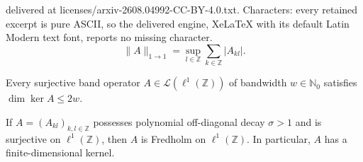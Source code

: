 \documentclass[10pt,a4paper]{amsart}
\def\Z{{\mathbb Z}}
\begin{document}
delivered at licenses/arxiv-2608.04992-CC-BY-4.0.txt. Characters: every retained excerpt is pure ASCII, so the delivered engine, XeLaTeX with its default Latin Modern text font, reports no missing character.
\begin{equation}\label{eq:op_norm_bound}
    \| A \|_{1 \to 1} 
    =\sup_{l\in\mathbb Z}\sum_{k\in\mathbb Z}|A_{kl}|.
\end{equation}

\begin{proposition}\label{prop:surjective_band_kernel_bound}
    Every surjective band operator $A\in\mathcal L(\ell^1(\Z))$ of
bandwidth $w\in\mathbb N_0$ satisfies
$
\dim\ker A\leq 2w .
$
\end{proposition}

\begin{theorem}\label{thm:surjectivity_implies_Fredholm}
If $A = (A_{kl})_{k,l \in \Z}$ possesses  polynomial off-diagonal
decay $\sigma >1$ and  is surjective on $\ell^1(\Z)$, then $A$ is Fredholm on $\ell^1(\Z)$. In particular, $A$ has a finite-dimensional kernel. 
\end{theorem}
\end{document}
